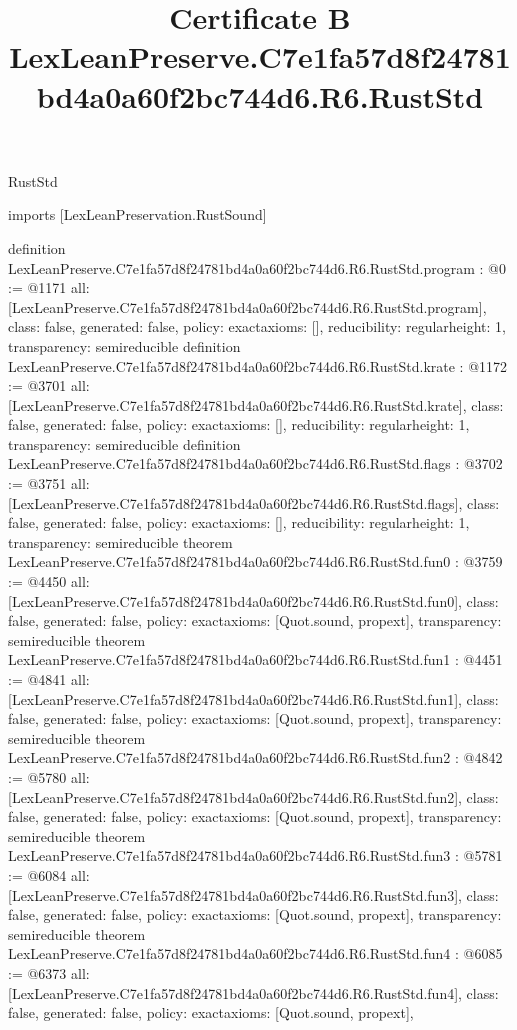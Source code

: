 \begin{lexlean}{RustStd}
\title{Certificate B LexLeanPreserve.C7e1fa57d8f24781bd4a0a60f2bc744d6.R6.RustStd}
\begin{coremodule}
imports [LexLeanPreservation.RustSound]

definition LexLeanPreserve.C7e1fa57d8f24781bd4a0a60f2bc744d6.R6.RustStd.program : @0 := @1171 {
  all: [LexLeanPreserve.C7e1fa57d8f24781bd4a0a60f2bc744d6.R6.RustStd.program],
  class: false,
  generated: false,
  policy: exact{axioms: []},
  reducibility: regular{height: 1},
  transparency: semireducible
}
definition LexLeanPreserve.C7e1fa57d8f24781bd4a0a60f2bc744d6.R6.RustStd.krate : @1172 := @3701 {
  all: [LexLeanPreserve.C7e1fa57d8f24781bd4a0a60f2bc744d6.R6.RustStd.krate],
  class: false,
  generated: false,
  policy: exact{axioms: []},
  reducibility: regular{height: 1},
  transparency: semireducible
}
definition LexLeanPreserve.C7e1fa57d8f24781bd4a0a60f2bc744d6.R6.RustStd.flags : @3702 := @3751 {
  all: [LexLeanPreserve.C7e1fa57d8f24781bd4a0a60f2bc744d6.R6.RustStd.flags],
  class: false,
  generated: false,
  policy: exact{axioms: []},
  reducibility: regular{height: 1},
  transparency: semireducible
}
theorem LexLeanPreserve.C7e1fa57d8f24781bd4a0a60f2bc744d6.R6.RustStd.fun0 : @3759 := @4450 {
  all: [LexLeanPreserve.C7e1fa57d8f24781bd4a0a60f2bc744d6.R6.RustStd.fun0],
  class: false,
  generated: false,
  policy: exact{axioms: [Quot.sound, propext]},
  transparency: semireducible
}
theorem LexLeanPreserve.C7e1fa57d8f24781bd4a0a60f2bc744d6.R6.RustStd.fun1 : @4451 := @4841 {
  all: [LexLeanPreserve.C7e1fa57d8f24781bd4a0a60f2bc744d6.R6.RustStd.fun1],
  class: false,
  generated: false,
  policy: exact{axioms: [Quot.sound, propext]},
  transparency: semireducible
}
theorem LexLeanPreserve.C7e1fa57d8f24781bd4a0a60f2bc744d6.R6.RustStd.fun2 : @4842 := @5780 {
  all: [LexLeanPreserve.C7e1fa57d8f24781bd4a0a60f2bc744d6.R6.RustStd.fun2],
  class: false,
  generated: false,
  policy: exact{axioms: [Quot.sound, propext]},
  transparency: semireducible
}
theorem LexLeanPreserve.C7e1fa57d8f24781bd4a0a60f2bc744d6.R6.RustStd.fun3 : @5781 := @6084 {
  all: [LexLeanPreserve.C7e1fa57d8f24781bd4a0a60f2bc744d6.R6.RustStd.fun3],
  class: false,
  generated: false,
  policy: exact{axioms: [Quot.sound, propext]},
  transparency: semireducible
}
theorem LexLeanPreserve.C7e1fa57d8f24781bd4a0a60f2bc744d6.R6.RustStd.fun4 : @6085 := @6373 {
  all: [LexLeanPreserve.C7e1fa57d8f24781bd4a0a60f2bc744d6.R6.RustStd.fun4],
  class: false,
  generated: false,
  policy: exact{axioms: [Quot.sound, propext]},
}
\end{coremodule}
\end{lexlean}

